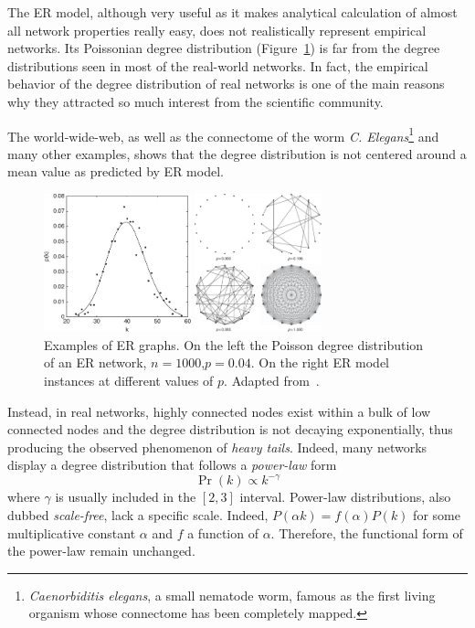 The ER model, although very useful as it makes analytical calculation of almost all network properties really easy, does not realistically represent empirical networks.
Its Poissonian degree distribution (Figure~\ref{fig:deg_dist_poisson_er}) is far from the degree distributions seen in most of the real-world networks.
In fact, the empirical behavior of the degree distribution of real networks is one of the main reasons why they attracted so much interest from the scientific community.

The world-wide-web, as well as the connectome of the worm \emph{C.
Elegans}\footnote{\emph{Caenorbiditis elegans}, a small nematode worm, famous as the first living organism whose connectome has been completely mapped.} and many other examples, shows that the degree distribution is not centered around a mean value as predicted by ER model.


\begin{figure}
\centering
\begin{minipage}[b]{0.5\textwidth}\centering
\includegraphics[height=4cm]{images/deg_dist_poisson_er.pdf}
\end{minipage}\noindent
\begin{minipage}[b]{0.5\textwidth}\centering
\includegraphics[height=4cm]{images/er_graphs.pdf}
\end{minipage}
\caption{Examples of ER graphs.
On the left the Poisson degree distribution of an ER network, $n=1000$,$p=0.04$.
On the right ER model instances at different values of $p$.
Adapted from~\cite{estrada2011}.}
\label{fig:deg_dist_poisson_er}
\end{figure}

Instead, in real networks, highly connected nodes exist within a bulk of low connected nodes and the degree distribution is not decaying exponentially, thus producing the observed phenomenon of \emph{heavy tails}.
Indeed, many networks display a degree distribution that follows a \emph{power-law} form
\begin{equation}
\Pr(k) \propto k^{-\gamma}
\end{equation}
where $\gamma$ is usually included in the $[2,3]$ interval.
Power-law distributions, also dubbed \emph{scale-free}, lack a specific scale.
Indeed, $P(\alpha k)=f(\alpha)P(k)$ for some multiplicative constant $\alpha$  and $f$ a function of $\alpha$.
Therefore, the functional form of the power-law remain unchanged.

